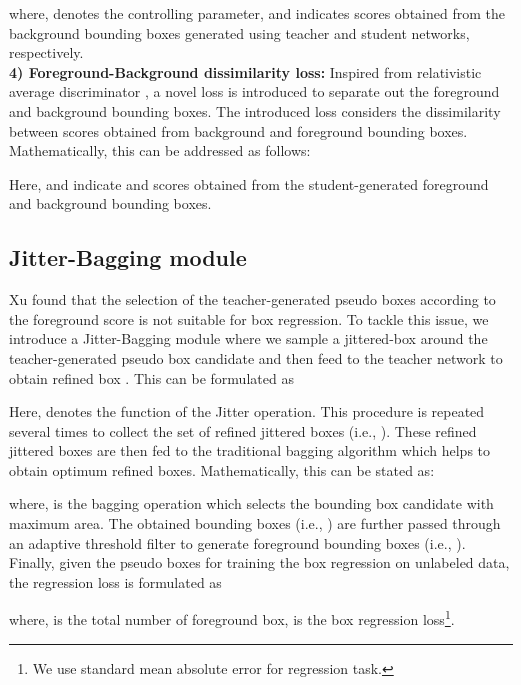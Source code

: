 \documentclass[10pt,twocolumn,letterpaper]{article}
\begin{document}
where,  denotes the controlling parameter,  and  indicates  scores obtained from the background bounding boxes generated using teacher and student networks, respectively. \\
\textbf{4) Foreground-Background dissimilarity loss:} 
Inspired from relativistic average discriminator \cite{relativistic}, a novel loss is introduced to separate out the foreground and background bounding boxes. The introduced loss considers the dissimilarity between scores obtained from background and foreground bounding boxes. Mathematically, this can be addressed as follows:

Here,  and  indicate  and  scores obtained from the student-generated foreground and background bounding boxes. 

\subsection{Jitter-Bagging module}
Xu \etal \cite{xu2021end} found that the selection of the teacher-generated pseudo boxes according to the foreground score is not suitable for box regression. 
To tackle this issue, we introduce a Jitter-Bagging module where we sample a jittered-box around the teacher-generated pseudo box candidate  and then feed to the teacher network to obtain refined box . This can be formulated as

Here,  denotes the function of the Jitter operation. This procedure is repeated several times to collect the set of  refined jittered boxes (i.e., ). These refined jittered boxes are then fed to the traditional bagging algorithm which helps to obtain optimum refined boxes. Mathematically, this can be stated as:

where,  is the bagging operation which selects the bounding box candidate with maximum area. The obtained bounding boxes (i.e., ) are further passed through an adaptive threshold filter to generate foreground bounding boxes (i.e., ). Finally, given the pseudo boxes  for training the box regression on unlabeled data, the regression loss is formulated as

where,  is the total number of foreground box,  is the box regression loss\footnote{We use standard mean absolute error for regression task.}.
\end{document}

